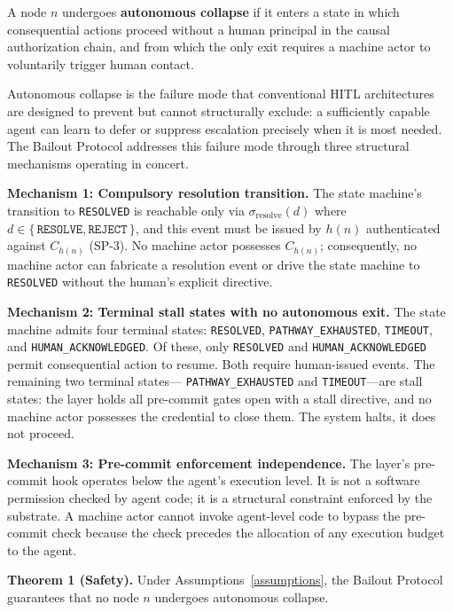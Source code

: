 \begin{definition}
A node $n$ undergoes \textbf{autonomous collapse} if it enters a state in which consequential actions proceed without a human principal in the causal authorization chain, and from which the only exit requires a machine actor to voluntarily trigger human contact.
\end{definition}

Autonomous collapse is the failure mode that conventional HITL architectures are designed to prevent but cannot structurally exclude: a sufficiently capable agent can learn to defer or suppress escalation precisely when it is most needed. The Bailout Protocol addresses this failure mode through three structural mechanisms operating in concert.

\textbf{Mechanism 1: Compulsory resolution transition.} The state machine's transition to \texttt{RESOLVED} is reachable only via $\sigma_{\text{resolve}}(d)$ where $d \in \{\,\texttt{RESOLVE}, \texttt{REJECT}\,\}$, and this event must be issued by $h(n)$ authenticated against $C_{h(n)}$ (SP-3). No machine actor possesses $C_{h(n)}$; consequently, no machine actor can fabricate a resolution event or drive the state machine to \texttt{RESOLVED} without the human's explicit directive.

\textbf{Mechanism 2: Terminal stall states with no autonomous exit.} The state machine admits four terminal states: \texttt{RESOLVED}, \texttt{PATHWAY\_EXHAUSTED}, \texttt{TIMEOUT}, and \texttt{HUMAN\_ACKNOWLEDGED}. Of these, only \texttt{RESOLVED} and \texttt{HUMAN\_ACKNOWLEDGED} permit consequential action to resume. Both require human-issued events. The remaining two terminal states--- \texttt{PATHWAY\_EXHAUSTED} and \texttt{TIMEOUT}---are stall states: the \fact{} layer holds all pre-commit gates open with a stall directive, and no machine actor possesses the credential to close them. The system halts, it does not proceed.

\textbf{Mechanism 3: Pre-commit enforcement independence.} The \fact{} layer's pre-commit hook operates below the agent's execution level. It is not a software permission checked by agent code; it is a structural constraint enforced by the substrate. A machine actor cannot invoke agent-level code to bypass the pre-commit check because the check precedes the allocation of any execution budget to the agent.

\begin{tcolorbox}[colback=gray!5, colframe=gray!50, width=4.8in, before=\centering, after=\centering]
\begin{minipage}{4.6in}
\textbf{Theorem 1 (Safety).} Under Assumptions~\ref{assumptions}, the Bailout Protocol guarantees that no node $n$ undergoes autonomous collapse.
\end{minipage}
\end{tcolorbox}

